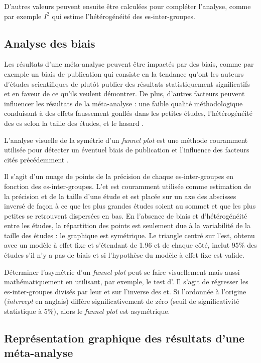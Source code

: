 D'autres valeurs peuvent ensuite être calculées pour compléter l'analyse, comme par exemple $I^2$ qui estime l'hétérogénéité des \gls{es}-inter-groupes. 

\subsection{Analyse des biais}

Les résultats d'une méta-analyse peuvent être impactés par des biais, comme par exemple un biais de publication qui consiste en la tendance qu'ont les auteurs 
d'études scientifiques de plutôt publier des résultats statistiquement significatifs et en faveur de ce qu'ils veulent démontrer. De plus,
d'autres facteurs peuvent influencer les résultats de la méta-analyse : une faible qualité méthodologique conduisant à des effets faussement gonflés
dans les petites études, l'hétérogénéité des \gls{es} selon la taille des études, et le hasard \citep{Sterne2011}.

L'analyse visuelle de la symétrie d'un \textit{funnel plot} est une méthode couramment utilisée pour détecter un éventuel biais de publication et 
l'influence des facteurs cités précédemment \citep{Sterne2011}.

Il s'agit d'un nuage de points de la précision de chaque \gls{es}-inter-groupes en fonction des \gls{es}-inter-groupes. L'\gls{et} est couramment 
utilisée comme estimation de la précision et de la taille d'une étude et est placée sur un axe des abscisses inversé de façon à ce que les plus grandes études 
soient au sommet et que les plus petites se retrouvent 
dispersées en bas. En l'absence de biais et d'hétérogénéité entre les études, la répartition des points est seulement due à la variabilité de la taille des études : 
le graphique est symétrique. Le triangle centré sur l'\gls{est}, obtenu avec un modèle à effet fixe et s'étendant de 1.96 \gls{et} de chaque côté, 
inclut 95\% des études s'il n'y a pas de biais et si l'hypothèse du modèle à effet fixe est valide.

Déterminer l'asymétrie d'un \textit{funnel plot} peut se faire visuellement mais aussi mathématiquement en utilisant, par exemple, le test d'\citet{Egger1997}. 
Il s'agit de régresser les \gls{es}-inter-groupes divisés par leur \gls{et} sur l'inverse des \gls{et}. Si l'ordonnée à l'origine (\textit{intercept} en anglais) diffère significativement de 
zéro (seuil de significativité statistique à 5\%), alors le \textit{funnel plot} est asymétrique.

\subsection{Représentation graphique des résultats d'une méta-analyse}

